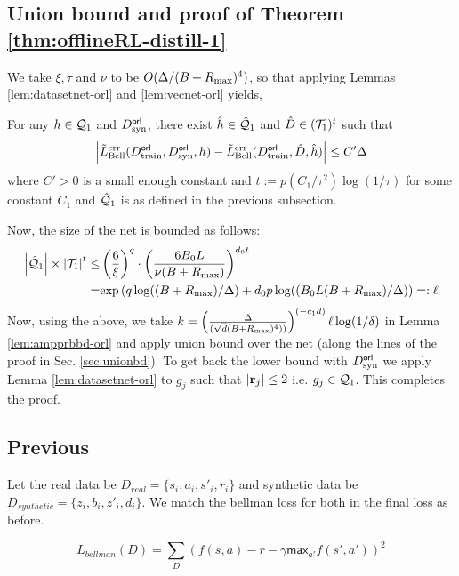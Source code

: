\subsection{Union bound and proof of Theorem \ref{thm:offlineRL-distill-1}}
We take $\xi, \tau$ and $\nu$ to be $O(\Delta/(B + R_{\textnormal{max}})^4)$, so that applying Lemmas \ref{lem:datasetnet-orl} and \ref{lem:vecnet-orl} yields,
\begin{lemma}\label{lem:combinedned-orl}
For any $h\in \mathcal{Q}_1$ and $D^{\sf orl}_{\textnormal{syn}}$, there exist $\hat{h} \in \hat{\mathcal{Q}}_1$ and $\hat{D} \in (\mathcal{T}_1)^t$ such that
\begin{equation}
    \left|\tilde{L}^{\textnormal{err}}_{\textnormal{Bell}}(D^{\sf orl}_{\textnormal{train}}, D^{\sf orl}_{\textnormal{syn}}, h) - \tilde{L}^{\textnormal{err}}_{\textnormal{Bell}}(D^{\sf orl}_{\textnormal{train}}, \hat{D}, \hat{h})\right| \leq C'\Delta
\end{equation}
where $C'>0$ is a small enough constant and $t := p(C_1/\tau^2)\log(1/\tau)$ for some constant $C_1$ and $\hat{\mathcal{Q}}_1$ is as defined in the previous subsection.
\end{lemma}
Now, the size of the net is bounded as follows:
\begin{align}
    \left|\hat{\mathcal{Q}}_1\right|\times \left|\mathcal{T}_1\right|^t \leq & \left(\frac{6}{\xi}\right)^q \cdot \left(\frac{6B_0L}{\nu(B+R_{\textnormal{max}})}\right)^{d_0t}  \nonumber \\
    = & \textnormal{exp}\left(q\log((B+R_{\textnormal{max}})/\Delta) + d_0p\log((B_0L(B+R_{\textnormal{max}})/\Delta)\right) =: \ell
\end{align}
Now, using the above,  we take $k = \left(\frac{\Delta}{(\sqrt{d}(B + R_{\textnormal{max}})^4))}\right)^{(-c_1 d)}\ell\log(1/\delta)$ in Lemma \ref{lem:ampprbbd-orl} and apply union bound over the net (along the lines of the proof in Sec. \ref{sec:unionbd}).   To get back the lower bound with $D^{\sf orl}_{\textnormal{syn}}$ we apply Lemma \ref{lem:datasetnet-orl} to $g_j$ such that $\left|{\mathbf{r}}_j\right| \leq 2$ i.e. $g_j \in \mathcal{Q}_1$. This completes the proof. 

\iffalse
\subsection{Previous}

Let the real data be $D_{real} = \{s_i,a_i,s'_i,r_i\}$ and synthetic data be $D_{synthetic} = \{z_i,b_i,z'_i,d_i\}$. We match the bellman loss for both in the final loss as before.

\[
L_{bellman}(D) = \sum_{D}(f(s,a) - r -\gamma \mathsf{max}_{a'}f(s',a'))^2 
\]

